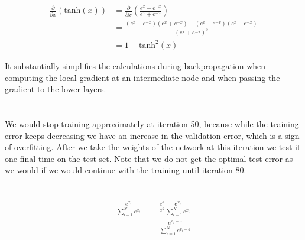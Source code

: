 \documentclass[11pt]{article}
\newcommand{\exercise}{\section{}}
\newcommand{\sumf}[3]{\sum_{#1}^{#2} #3}
\newcommand{\partialf}[1]{\frac{\partial}{{\partial #1}}}
\begin{document}
\exercise

\exercise

\exercise

\begin{align*}
\partialf{x}(\text{tanh}(x)) &= \partialf{x}(\frac{e^x - e^{-x}}{e^x + e^{-x}}) \\
&= \frac{ ( e^x + e^{-x} )( e^x + e^{-x}) - ( e^x - e^{-x} )( e^x - e^{-x} )}{ ( e^x + e^{-x} )^2 } \\
&= 1 - \text{tanh}^2(x)
\end{align*}

It substantially simplifies the calculations during backpropagation when computing the local gradient at an intermediate node and when passing the gradient to the lower layers.

\exercise

\exercise

\exercise

We would stop training approximately at iteration 50, because while the training error keeps decreasing we have an increase in the validation error, which is a sign of overfitting. After we take the weights of the network at this iteration we test it one final time on the test set. Note that we do not get the optimal test error as we would if we would continue with the training until iteration 80.

\exercise

\exercise

\begin{align*}
\frac{e^{x_i}}{\sumf{i=1}{N}{e^{x_i}}} &= \frac{e^{a}}{e^{a}} \frac{e^{x_i}}{\sumf{i=1}{N}{e^{x_i}}} \\
&= \frac{e^{x_i - a}}{\sumf{i=1}{N}{e^{x_i - a}}}
\end{align*}

\exercise
\end{document}
